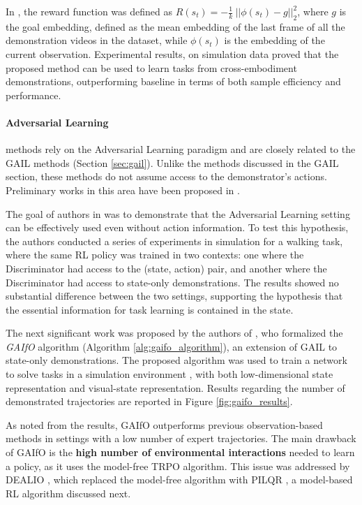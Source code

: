 
In \cite{zakka2022xirl}, the reward function was defined as $R(s_{t}) = -\frac{1}{k} \ || \phi(s_{t}) - g||^{2}_{2}$, where $g$ is the goal embedding, defined as the mean embedding of the last frame of all the demonstration videos in the dataset, while $\phi(s_{t})$ is the embedding of the current observation. Experimental results, on simulation data proved that the proposed method can be used to learn tasks from cross-embodiment demonstrations, outperforming baseline \cite{sermanet2018time_contrastive} in terms of both sample efficiency and performance.


\paragraph*{Adversarial Learning} methods rely on the Adversarial Learning paradigm and are closely related to the GAIL methods (Section \ref{sec:gail}). Unlike the methods discussed in the GAIL section, these methods do not assume access to the demonstrator's actions. Preliminary works in this area have been proposed in \cite{merel2017learning,torabi2018gaifo}.

The goal of authors in \cite{merel2017learning} was to demonstrate that the Adversarial Learning setting can be effectively used even without action information. To test this hypothesis, the authors conducted a series of experiments in simulation for a walking task, where the same RL policy was trained in two contexts: one where the Discriminator had access to the (state, action) pair, and another where the Discriminator had access to state-only demonstrations. The results showed no substantial difference between the two settings, supporting the hypothesis that the essential information for task learning is contained in the state.



The next significant work was proposed by the authors of \cite{torabi2018gaifo}, who formalized the \textit{GAIfO} algorithm (Algorithm \ref{alg:gaifo_algorithm}), an extension of GAIL \cite{ho2016gail} to state-only demonstrations. The proposed algorithm was used to train a network to solve tasks in a simulation environment \cite{brockman2016openai}, with both low-dimensional state representation and visual-state representation. Results regarding the number of demonstrated trajectories are reported in Figure \ref{fig:gaifo_results}.

As noted from the results, GAIfO outperforms previous observation-based methods \cite{sermanet2018time_contrastive,torabi2018bco} in settings with a low number of expert trajectories. The main drawback of GAIfO is the \textbf{high number of environmental interactions} needed to learn a policy, as it uses the model-free TRPO \cite{schulman2015trpo} algorithm. This issue was addressed by DEALIO \cite{torabi2021dealio}, which replaced the model-free algorithm with PILQR \cite{chebotar2017pilqr}, a model-based RL algorithm discussed next.

